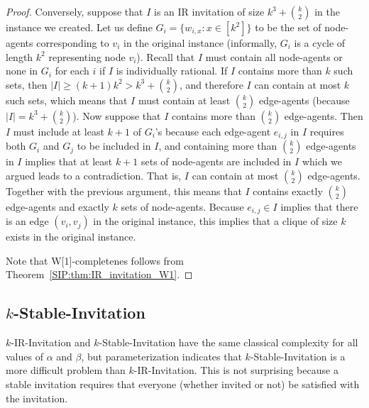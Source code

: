 \begin{proof}
	Conversely, suppose that $I$ is an IR invitation of size $k^3 + \binom{k}{2}$ in the instance we created.
	Let us define $G_i = \{w_{i,x} : x\in [k^2]\}$ to be the set of node-agents corresponding to $v_i$ in the original instance (informally, $G_i$ is a cycle of length $k^2$ representing node $v_i$). Recall that $I$ must contain all node-agents or none in $G_i$ for each $i$ if $I$ is individually rational. If $I$ contains more than $k$ such sets, then $|I| \geq (k+1)k^2 > k^3 + \binom{k}{2}$, and therefore $I$ can contain at most $k$ such sets, which means that $I$ must contain at least $\binom{k}{2}$ edge-agents (because $|I| = k^3 + \binom{k}{2}$). 
	Now suppose that $I$ contains more than $\binom{k}{2}$ edge-agents. Then $I$ must include at least $k+1$ of $G_i$'s because each edge-agent $e_{i,j}$ in $I$ requires both $G_i$ and $G_j$ to be included in $I$, and containing more than $\binom{k}{2}$ edge-agents in $I$ implies that at least $k+1$ sets of node-agents are included in $I$ which we argued leads to a contradiction. That is, $I$ can contain at most $\binom{k}{2}$ edge-agents. Together with the previous argument, this means that $I$ contains exactly $\binom{k}{2}$ edge-agents and exactly $k$ sets of node-agents. Because $e_{i,j} \in I$ implies that there is an edge $(v_i, v_j)$ in the original instance, this implies that a clique of size $k$ exists in the original instance. 

	
	Note that W[1]-completenes follows from Theorem~\ref{SIP:thm:IR_invitation_W1}.
\end{proof}








\subsection{$k$-Stable-Invitation}
 
$k$-IR-Invitation and $k$-Stable-Invitation have the same classical complexity for all values of $\alpha$ and $\beta$, but parameterization indicates that $k$-Stable-Invitation is a more difficult problem than $k$-IR-Invitation.
This is not surprising because a stable invitation requires that everyone (whether invited or not) be satisfied with the invitation.

